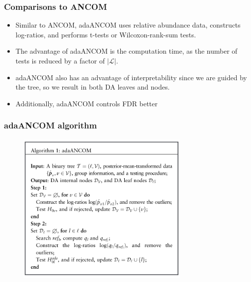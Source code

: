 \documentclass{beamer}
\begin{document}

\begin{frame}
\frametitle{Comparisons to ANCOM}
\begin{itemize}
  \item Similar to ANCOM, adaANCOM uses relative abundance data, constructs log-ratios, and performs t-tests or Wilcoxon-rank-sum tests.
  \item The advantage of adaANCOM is the computation time, as the number of tests is reduced by a factor of $|\mathcal{L}|$.
  \item adaANCOM also has an advantage of interpretability since we are guided by the tree, so we result in both DA leaves and nodes.
  \item Additionally, adaANCOM controls FDR better
\end{itemize}
\end{frame}

\begin{frame}
\frametitle{adaANCOM algorithm}
\begin{figure}[!htb]
	\centering
	\includegraphics[width=0.75\textwidth]{img/algorithm.png}
	\caption{}
	\label{}
\end{figure}
\end{frame}


  
\end{document}
